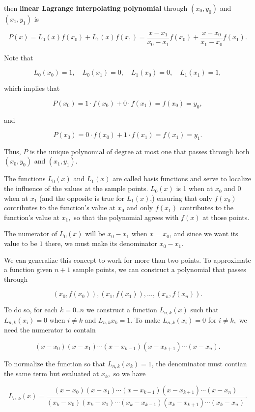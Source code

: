 \documentclass{article}
\begin{document}
then \textbf{linear Lagrange interpolating polynomial} through $(x_0, y_0)$ and $(x_1, y_1)$ is

\[ P(x) = L_0(x)f(x_0) + L_1(x)f(x_1) = \frac{x - x_1}{x_0 - x_1}f(x_0) + \frac{x - x_0}{x_1 - x_0}f(x_1). \]

Note that

\[ L_0(x_0) = 1, \quad L_0(x_1) = 0, \quad L_1(x_0) = 0, \quad L_1(x_1) = 1, \]

which implies that

\[ P(x_0) = 1 \cdot f(x_0) + 0 \cdot f(x_1) = f(x_0) = y_0, \]

and

\[ P(x_0) = 0 \cdot f(x_0) + 1 \cdot f(x_1) = f(x_1) = y_1. \]

Thus, $P$ is the unique polynomial of degree at most one that passes through both $(x_0, y_0)$ and $(x_1, y_1).$

The functions $L_0(x)$ and $L_1(x)$ are called basis functions and serve to localize the influence of the values at the sample points. $L_0(x)$ is 1 when at $x_0$ and 0 when at $x_1$ (and the opposite is true for $L_1(x)$,) ensuring that only $f(x_0)$ contributes to the function's value at $x_0$ and only $f(x_1)$ contributes to the function's value at $x_1,$ so that the polynomial agrees with $f(x)$ at those points.

The numerator of $L_0(x)$ will be $x_0 - x_1$ when $x = x_0$, and since we want its value to be $1$ there, we must make its denominator $x_0 - x_1$.

We can generalize this concept to work for more than two points. To approximate a function given $n + 1$ sample points, we can construct a polynomial that passes through

\[ (x_0, f(x_0)), (x_1, f(x_1)), \dots, (x_n, f(x_n)). \]

To do so, for each $k = 0..n$ we construct a function $L_{n,k}(x)$ such that $L_{n,k}(x_i) = 0$ when $i \neq k$ and $L_{n,k}{x_k} = 1.$ To make $L_{n,k}(x_i) = 0$ for $i \neq k,$ we need the numerator to contain

\[ (x - x_0)(x - x_1)\cdots(x - x_{k-1})(x - x_{k+1})\cdots(x - x_n). \]

To normalize the function so that $L_{n, k}(x_k) = 1$, the denominator must contian the same term but evaluated at $x_k,$ so we have

\[ L_{n, k}(x) = \frac{(x - x_0)(x - x_1)\cdots(x - x_{k-1})(x - x_{k+1})\cdots(x - x_n)}{(x_k - x_0)(x_k - x_1)\cdots(x_k - x_{k-1})(x_k - x_{k+1})\cdots(x_k - x_n)}. \]
\end{document}
